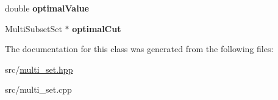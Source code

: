 \begin{DoxyCompactItemize}
\item 
\hypertarget{classMultiSubset_a81cd9865a90acb0f0fef1380caf49924}{double {\bfseries optimal\-Value}}\label{classMultiSubset_a81cd9865a90acb0f0fef1380caf49924}

\item 
\hypertarget{classMultiSubset_a2351a70cf4da1c2d1872c05eac77469a}{Multi\-Subset\-Set $\ast$ {\bfseries optimal\-Cut}}\label{classMultiSubset_a2351a70cf4da1c2d1872c05eac77469a}

\end{DoxyCompactItemize}


The documentation for this class was generated from the following files\-:\begin{DoxyCompactItemize}
\item 
src/\hyperlink{multi__set_8hpp}{multi\-\_\-set.\-hpp}\item 
src/multi\-\_\-set.\-cpp\end{DoxyCompactItemize}
